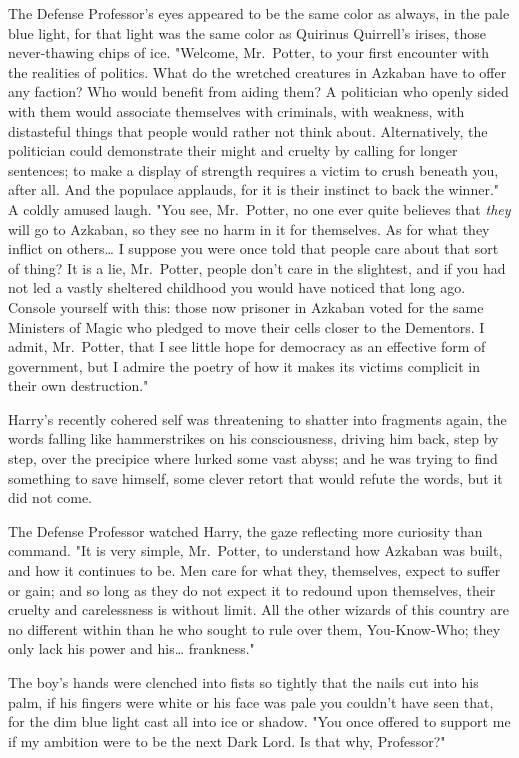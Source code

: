 The Defense Professor's eyes appeared to be the same color as always, in the 
pale blue light, for that light was the same color as Quirinus Quirrell's 
irises, those never-thawing chips of ice. "Welcome, Mr.~Potter, to your first 
encounter with the realities of politics. What do the wretched creatures in 
Azkaban have to offer any faction? Who would benefit from aiding them? A 
politician who openly sided with them would associate themselves with 
criminals, with weakness, with distasteful things that people would rather not 
think about. Alternatively, the politician could demonstrate their might and 
cruelty by calling for longer sentences; to make a display of strength requires 
a victim to crush beneath you, after all. And the populace applauds, for it is 
their instinct to back the winner." A coldly amused laugh. "You see, 
Mr.~Potter, no one ever quite believes that \emph{they} will go to Azkaban, so 
they see no harm in it for themselves. As for what they inflict on 
others{\ldots} I suppose you were once told that people care about that sort of 
thing? It is a lie, Mr.~Potter, people don't care in the slightest, and if you 
had not led a vastly sheltered childhood you would have noticed that long ago. 
Console yourself with this: those now prisoner in Azkaban voted for the same 
Ministers of Magic who pledged to move their cells closer to the Dementors. I 
admit, Mr.~Potter, that I see little hope for democracy as an effective form of 
government, but I admire the poetry of how it makes its victims complicit in 
their own destruction."

Harry's recently cohered self was threatening to shatter into fragments again, 
the words falling like hammerstrikes on his consciousness, driving him back, 
step by step, over the precipice where lurked some vast abyss; and he was 
trying to find something to save himself, some clever retort that would refute 
the words, but it did not come.

The Defense Professor watched Harry, the gaze reflecting more curiosity than 
command. "It is very simple, Mr.~Potter, to understand how Azkaban was built, 
and how it continues to be. Men care for what they, themselves, expect to 
suffer or gain; and so long as they do not expect it to redound upon 
themselves, their cruelty and carelessness is without limit. All the other 
wizards of this country are no different within than he who sought to rule over 
them, You-Know-Who; they only lack his power and his{\ldots} frankness."

The boy's hands were clenched into fists so tightly that the nails cut into his 
palm, if his fingers were white or his face was pale you couldn't have seen 
that, for the dim blue light cast all into ice or shadow. "You once offered to 
support me if my ambition were to be the next Dark Lord. Is that why, 
Professor?"

